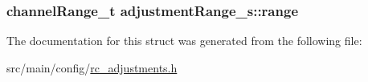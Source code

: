 \hypertarget{structadjustmentRange__s_a763e7fd821d77f0080781ea2ce6c7214}{
\subsubsection[{range}]{\setlength{\rightskip}{0pt plus 5cm}channel\+Range\+\_\+t adjustment\+Range\+\_\+s\+::range}}\label{structadjustmentRange__s_a763e7fd821d77f0080781ea2ce6c7214}


The documentation for this struct was generated from the following file\+:\begin{DoxyCompactItemize}
\item 
src/main/config/\hyperlink{config_2rc__adjustments_8h}{rc\+\_\+adjustments.\+h}\end{DoxyCompactItemize}
